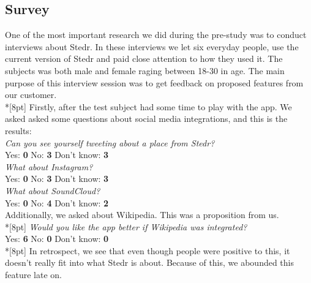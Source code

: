 		
	\subsection{Survey}


	One of the most important research we did during the pre-study was to conduct interviews about Stedr. In these interviews we let six everyday people, use the current version of Stedr and paid close attention to how they used it. The subjects was both male and female raging between 18-30 in age. The main purpose of this interview session was to get feedback on proposed features from our customer.\\*[8pt]
	Firstly, after the test subject had some time to play with the app. We asked asked some questions about social media integrations, and this is the results:\\

	\emph{Can you see yourself tweeting about a place from Stedr?}\\
	Yes: \textbf{0}\hspace{0.5cm}
	No: \textbf{3}\hspace{0.5cm}
	Don't know: \textbf{3}\\[6pt]
	
	\emph{What about Instagram?}\\
	Yes: \textbf{0}\hspace{0.5cm}
	No: \textbf{3}\hspace{0.5cm}
	Don't know: \textbf{3}\\[6pt]
	
	\emph{What about SoundCloud?}\\
	Yes: \textbf{0}\hspace{0.5cm}
	No: \textbf{4}\hspace{0.5cm}
	Don't know: \textbf{2}\hspace{0.5cm}\\[6pt]

	Additionally, we asked about Wikipedia. This was a proposition from us.\\*[8pt]
	\emph{Would you like the app better if Wikipedia was integrated?}\\
	Yes: \textbf{6}\hspace{0.5cm}
	No: \textbf{0}\hspace{0.5cm}
	Don't know:  \textbf{0}\\*[8pt]
	In retrospect, we see that even though people were positive to this, it doesn't really fit into what Stedr is about. Because of this, we abounded this feature late on.\\
	
